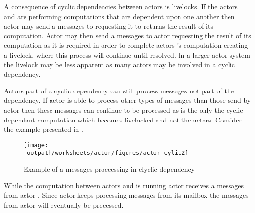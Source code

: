 A consequence of cyclic dependencies between actors is livelocks. If the actors  and  are performing computations that are dependent upon one another then actor  may send a messages to  requesting it to returns the result of its computation. Actor  may then send a messages to actor  requesting the result of its computation as it is required in order to complete actors 's computation creating a livelock, where this process will continue until resolved. In a larger actor system the livelock may be less apparent as many actors may be involved in a cyclic dependency.

Actors part of a cyclic dependency can still process messages not part of the dependency. If actor  is able to process other types of messages than those send by actor  then these messages can continue to be processed as is the only the cyclic dependant computation which becomes livelocked and not the actors. Consider the example presented in .

\begin{figure}[ht!]
\centering
\texttt{[image: \\rootpath/worksheets/actor/figures/actor\_cylic2]}
\caption{Example of a messages proccessing in clyclic dependency}\label{fig:actor_cyclic2}
\end{figure}

While the computation between actors  and  is running actor  receives a messages from actor . Since actor  keeps processing messages from its mailbox the messages from actor  will eventually be processed.

